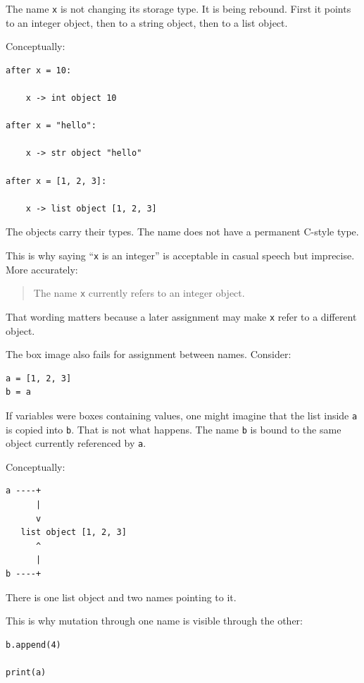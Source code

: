 The name \texttt{x} is not changing its storage type. It is being rebound. First it points to an integer object, then to a string object, then to a list object.

Conceptually:

\begin{verbatim}
after x = 10:

    x -> int object 10

after x = "hello":

    x -> str object "hello"

after x = [1, 2, 3]:

    x -> list object [1, 2, 3]
\end{verbatim}

The objects carry their types. The name does not have a permanent C-style type.

This is why saying ``\texttt{x} is an integer'' is acceptable in casual speech but imprecise. More accurately:

\begin{quote}
The name \texttt{x} currently refers to an integer object.
\end{quote}

That wording matters because a later assignment may make \texttt{x} refer to a different object.

The box image also fails for assignment between names. Consider:

\begin{verbatim}
a = [1, 2, 3]
b = a
\end{verbatim}

If variables were boxes containing values, one might imagine that the list inside \texttt{a} is copied into \texttt{b}. That is not what happens. The name \texttt{b} is bound to the same object currently referenced by \texttt{a}.

Conceptually:

\begin{verbatim}
a ----+
      |
      v
   list object [1, 2, 3]
      ^
      |
b ----+
\end{verbatim}

There is one list object and two names pointing to it.

This is why mutation through one name is visible through the other:

\begin{verbatim}
b.append(4)

print(a)
\end{verbatim}

